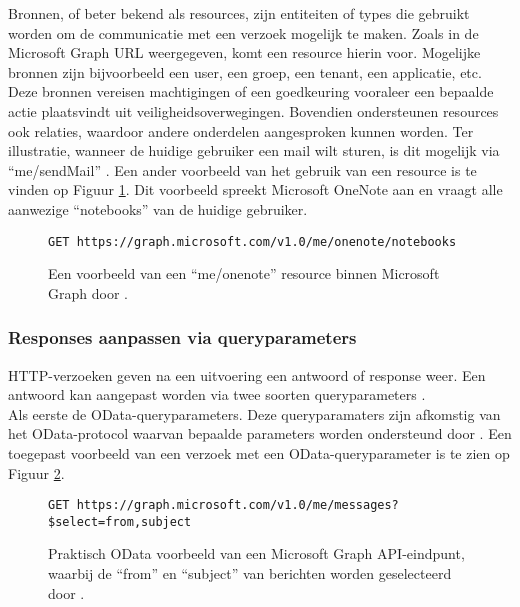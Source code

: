 Bronnen, of beter bekend als resources, zijn entiteiten of types die gebruikt worden om de communicatie met een verzoek mogelijk te maken. Zoals in de Microsoft Graph \ac{URL} weergegeven, komt een resource hierin voor. Mogelijke bronnen zijn bijvoorbeeld een user, een groep, een tenant, een applicatie, etc. Deze bronnen vereisen machtigingen of een goedkeuring vooraleer een bepaalde actie plaatsvindt uit veiligheidsoverwegingen. Bovendien ondersteunen resources ook relaties, waardoor andere onderdelen aangesproken kunnen worden. Ter illustratie, wanneer de huidige gebruiker een mail wilt sturen, is dit mogelijk via “me/sendMail” \autocite{Microsoft2023vv}. Een ander voorbeeld van het gebruik van een resource is te vinden op Figuur \ref{MSGR}. Dit voorbeeld spreekt Microsoft OneNote aan en vraagt alle aanwezige “notebooks” van de huidige gebruiker. 

\begin{figure}[h]
    \scriptsize
    \begin{verbatim}
GET https://graph.microsoft.com/v1.0/me/onenote/notebooks
    \end{verbatim}    
    \caption[Voorbeeld Microsoft Graph resource]{Een voorbeeld van een “me/onenote” resource binnen Microsoft Graph door \textcite{Microsoft2022e}.}
    \label{MSGR}
\end{figure}



\subsubsection{Responses aanpassen via queryparameters}


\ac{HTTP}-verzoeken geven na een uitvoering een antwoord of response weer. Een antwoord kan aangepast worden via twee soorten queryparameters \autocite{Microsoft2023vv}. \\

Als eerste de OData-queryparameters. Deze queryparamaters zijn afkomstig van het OData-protocol waarvan bepaalde parameters worden ondersteund door \textcite{Microsoft2023g}. Een toegepast voorbeeld van een verzoek met een OData-queryparameter is te zien op Figuur \ref{TRAM}. \\

\begin{figure}[h]
    \scriptsize
    \begin{verbatim}
GET https://graph.microsoft.com/v1.0/me/messages?$select=from,subject
    \end{verbatim}    
    \caption[Voorbeeld OData HTTP-verzoek]{Praktisch OData voorbeeld van een Microsoft Graph \Ac{API}-eindpunt, waarbij de “from” en “subject” van berichten worden geselecteerd door \textcite{Microsoft2022e}.}
    \label{TRAM}
\end{figure}

